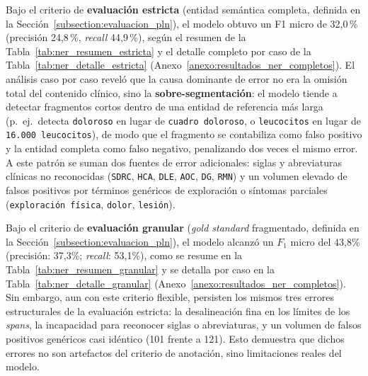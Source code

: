 Bajo el criterio de \textbf{evaluación estricta} (entidad semántica completa, definida en la
Sección~\ref{subsection:evaluacion_pln}), el modelo obtuvo un F1 micro de 32,0\,\% (precisión 24,8\,\%,
\textit{recall} 44,9\,\%), según el resumen de la Tabla~\ref{tab:ner_resumen_estricta} y el detalle
completo por caso de la Tabla~\ref{tab:ner_detalle_estricta} (Anexo~\ref{anexo:resultados_ner_completos}).
El análisis caso por caso reveló que la causa dominante de error no era la omisión total del
contenido clínico, sino la \textbf{sobre-segmentación}: el modelo tiende a detectar fragmentos cortos
dentro de una entidad de referencia más larga (p.\ ej.\ detecta \texttt{doloroso} en lugar de
\texttt{cuadro doloroso}, o \texttt{leucocitos} en lugar de \texttt{16.000 leucocitos}), de modo
que el fragmento se contabiliza como falso positivo y la entidad completa como falso negativo,
penalizando dos veces el mismo error. A este patrón se suman dos fuentes de error adicionales:
siglas y abreviaturas clínicas no reconocidas (\texttt{SDRC}, \texttt{HCA}, \texttt{DLE},
\texttt{AOC}, \texttt{DG}, \texttt{RMN}) y un volumen elevado de falsos positivos por términos
genéricos de exploración o síntomas parciales (\texttt{exploración física}, \texttt{dolor},
\texttt{lesión}).



Bajo el criterio de \textbf{evaluación granular} (\textit{gold standard} fragmentado, definida en la
Sección~\ref{subsection:evaluacion_pln}), el modelo alcanzó un $F_1$ micro del 43,8\% (precisión: 37,3\%;
\textit{recall}: 53,1\%), como se resume en la Tabla~\ref{tab:ner_resumen_granular} y se detalla por
caso en la Tabla~\ref{tab:ner_detalle_granular} (Anexo~\ref{anexo:resultados_ner_completos}). Sin
embargo, aun con este criterio flexible, persisten los mismos tres errores estructurales de la
evaluación estricta: la desalineación fina en los límites de los \textit{spans}, la incapacidad para
reconocer siglas o abreviaturas, y un volumen de falsos positivos genéricos casi idéntico (101 frente
a 121). Esto demuestra que dichos errores no son artefactos del criterio de anotación, sino
limitaciones reales del modelo.



